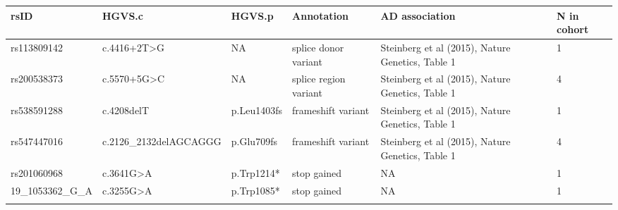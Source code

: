 \begin{longtable}{p{3.5cm} p{4.7cm} p{3cm} p{2.5cm} p{2.3cm} p{1cm}}
    \hline
    \textbf{rsID}          & \textbf{HGVS.c}           & \textbf{HGVS.p}    & \textbf{Annotation}                                                           & \textbf{AD association}                                                                   & \textbf{N in cohort} \\
    \hline
    \hline
    rs113809142            & c.4416+2T>G               & NA                 & splice donor variant \supercite{Allen2017-on}                                      & Steinberg et al (2015), Nature Genetics, Table 1 \supercite{Steinberg2015-vj}                   & 1 \\
    \hline
    rs200538373            & c.5570+5G>C               & NA                 & splice region variant \supercite{Allen2017-on,Steinberg2015-vj}                    & Steinberg et al (2015), Nature Genetics, Table 1 \supercite{Steinberg2015-vj}                   & 4 \\
    \hline
    rs538591288            & c.4208delT                & p.Leu1403fs        & frameshift variant \supercite{Allen2017-on}                                        & Steinberg et al (2015), Nature Genetics, Table 1 \supercite{Steinberg2015-vj}                   & 1 \\
    \hline
    rs547447016            & c.2126\_2132delAGCAGGG    & p.Glu709fs         & frameshift variant \supercite{Allen2017-on}                                        & Steinberg et al (2015), Nature Genetics, Table 1 \supercite{Steinberg2015-vj}                   & 4 \\
    \hline
    rs201060968            & c.3641G>A                & p.Trp1214*         & stop gained                                                                   & NA                                                                                        & 1 \\
    \hline
    19\_1053362\_G\_A       & c.3255G>A                & p.Trp1085*         & stop gained                                                                   & NA                                                                                        & 1 \\
    \hline
    \label{tab:annotation_abca7}
\end{longtable}

